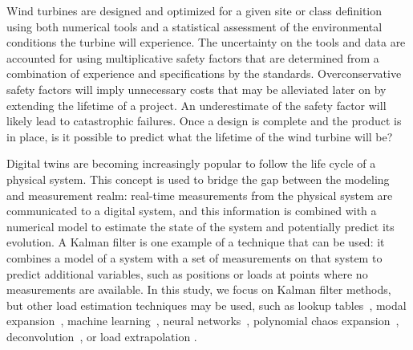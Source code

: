 \documentclass[wes, manuscript]{copernicus}
\begin{document}


\introduction 
Wind turbines are designed and optimized for a given site or class definition using both numerical tools and a statistical assessment of the environmental conditions the turbine will experience. The uncertainty on the tools and data are accounted for using multiplicative safety factors that are determined from a combination of experience and specifications by the standards. Overconservative safety factors will imply unnecessary costs that may be alleviated later on by extending the lifetime of a project. An underestimate of the safety factor will likely lead to catastrophic failures. 
Once a design is complete and the product is in place, is it possible to predict what the lifetime of the wind turbine will be?

Digital twins are becoming increasingly popular to follow the life cycle of a physical system.
This concept is used to bridge the gap between the modeling and measurement realm:
real-time measurements from the physical system are communicated to a digital system, and this information is combined with a numerical model to estimate the state of the system and potentially predict its evolution.
A Kalman filter is one example of a technique that can be used: it combines a model of a system with a set of measurements on that system to predict additional variables, such as positions or loads at points where no measurements are available. 
In this study, we focus on Kalman filter methods, but other load estimation techniques may be used, such as lookup tables~\citep{mendezreyes:2019}, modal expansion~\citep{iliopoulos:2016}, machine learning~\citep{evans:2018}, neural networks~\citep{schroder:2018}, polynomial chaos expansion~\citep{dimitrov:2018}, deconvolution~\citep{jacquelin:2003}, or load extrapolation \citep{ziegler:2017}.
\end{document}
